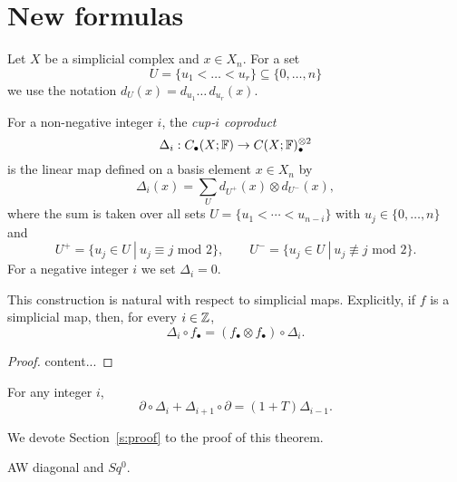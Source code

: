 
\section{New formulas} \label{s:new formulas}

Let $X$ be a simplicial complex and $x \in X_n$. For a set
\begin{equation*}
U = \{u_1 < \dots < u_r\} \subseteq \{0, \dots, n\}
\end{equation*}
we use the notation $d_U(x) = d_{u_1} \ldots\, d_{u_r}(x)$.

\begin{definition} \label{d:cup-i coproducts}	
	For a non-negative integer $i$, the \textit{cup-$i$ coproduct}
	\begin{equation*}
	\Delta_i : C_\bullet(X; \mathbb{F}) \to C(X; \mathbb{F})^{\otimes 2}_\bullet
	\end{equation*}
	is the linear map defined on a basis element $x \in X_n$ by
	\begin{equation} \label{equation: simplicial cup-i coproducts}
	\Delta_i(x) = \sum_U d_{U^+}(x) \otimes d_{U^-}(x),
	\end{equation}
	where the sum is taken over all sets $U = \{u_1 < \cdots < u_{n-i}\}$ with $u_j \in \{0, \dots, n\}$ and
	\begin{equation*}
	U^+ = \{u_j \in U\ |\ u_j \equiv j \text{ mod } 2\}, \qquad
	U^- = \{u_j \in U\ |\ u_j \not\equiv j \text{ mod } 2\}.
	\end{equation*}
	For a negative integer $i$ we set $\Delta_i = 0$.
\end{definition}

\begin{lemma}
	This construction is natural with respect to simplicial maps.
	Explicitly, if $f$ is a simplicial map, then, for every $i \in \mathbb{Z}$,
	\begin{equation*}
	\Delta_i \circ f_\bullet = (f_\bullet \otimes f_\bullet) \circ \Delta_i.
	\end{equation*}
\end{lemma}

\begin{proof}
	content...
\end{proof}

\begin{theorem} \label{t:main}
	For any integer $i$,
	\begin{equation} \label{eq: cup-i coproducts boundary relation}
	\partial \circ \Delta_{i} + \Delta_{i+1} \circ \partial = (1 +T ) \Delta_{i-1}.
	\end{equation}
\end{theorem}

We devote Section~\ref{s:proof} to the proof of this theorem.

\begin{example}
	AW diagonal and $Sq^0$.
\end{example}
